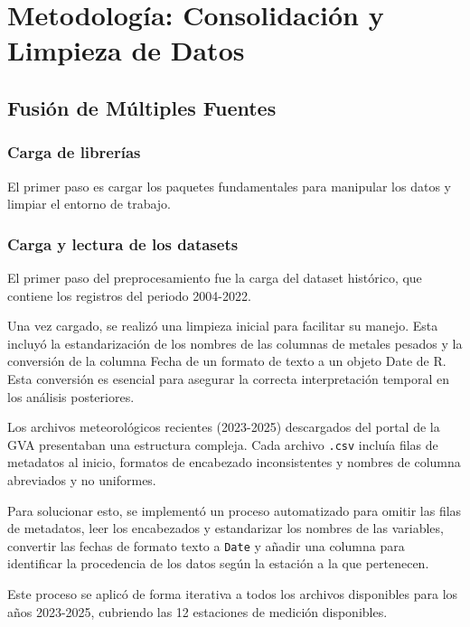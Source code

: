 \documentclass[,,,moreauthors,pdftex]{Definitions/mdpi}
\begin{document}
\section{Metodología: Consolidación y Limpieza de
Datos}\label{metodologuxeda-consolidaciuxf3n-y-limpieza-de-datos}

\subsection{Fusión de Múltiples
Fuentes}\label{fusiuxf3n-de-muxfaltiples-fuentes}

\subsubsection{Carga de librerías}\label{carga-de-libreruxedas}

El primer paso es cargar los paquetes fundamentales para manipular los
datos y limpiar el entorno de trabajo.

\subsubsection{Carga y lectura de los
datasets}\label{carga-y-lectura-de-los-datasets}

El primer paso del preprocesamiento fue la carga del dataset histórico,
que contiene los registros del periodo 2004-2022.

Una vez cargado, se realizó una limpieza inicial para facilitar su
manejo. Esta incluyó la estandarización de los nombres de las columnas
de metales pesados y la conversión de la columna Fecha de un formato de
texto a un objeto Date de R. Esta conversión es esencial para asegurar
la correcta interpretación temporal en los análisis posteriores.

Los archivos meteorológicos recientes (2023-2025) descargados del portal
de la GVA presentaban una estructura compleja. Cada archivo
\texttt{.csv} incluía filas de metadatos al inicio, formatos de
encabezado inconsistentes y nombres de columna abreviados y no
uniformes.

Para solucionar esto, se implementó un proceso automatizado para omitir
las filas de metadatos, leer los encabezados y estandarizar los nombres
de las variables, convertir las fechas de formato texto a \texttt{Date}
y añadir una columna para identificar la procedencia de los datos según
la estación a la que pertenecen.

Este proceso se aplicó de forma iterativa a todos los archivos
disponibles para los años 2023-2025, cubriendo las 12 estaciones de
medición disponibles.
\end{document}
